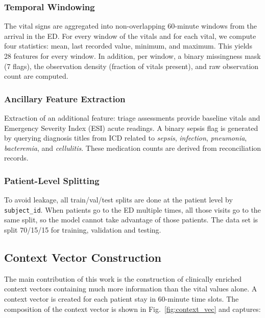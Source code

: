 \documentclass[conference]{IEEEtran}
\begin{document}
\subsubsection{Temporal Windowing}
The vital signs are aggregated into non-overlapping 60-minute windows from the arrival in the ED. For every window of the vitals and for each vital, we compute four statistics: mean, last recorded value, minimum, and maximum. This yields 28 features for every window. In addition, per window, a binary missingness mask (7 flags), the observation density (fraction of vitals present), and raw observation count are computed.

\subsubsection{Ancillary Feature Extraction}
Extraction of an additional feature: triage assessments provide baseline vitals and Emergency Severity Index (ESI) acute readings. A binary sepsis flag is generated by querying diagnosis titles from ICD related to \textit{sepsis}, \textit{infection}, \textit{pneumonia}, \textit{bacteremia}, and \textit{cellulitis}. These medication counts are derived from reconciliation records.

\subsubsection{Patient-Level Splitting}
To avoid leakage, all train/val/test splits are done at the patient level by \texttt{subject\_id}. When patients go to the ED multiple times, all those visits go to the same split, so the model cannot take advantage of those patients. The data set is split 70/15/15 for training, validation and testing.

\subsection{Context Vector Construction}

The main contribution of this work is the construction of clinically enriched context vectors containing much more information than the vital values alone. A context vector is created for each patient stay in 60-minute time slots. The composition of the context vector is shown in Fig.~\ref{fig:context_vec} and captures:
\end{document}
